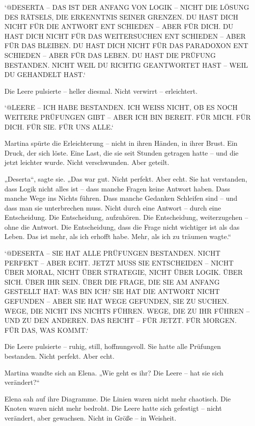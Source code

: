 \documentclass[
]{article}
\begin{document}
`@DESERTA -- DAS IST DER ANFANG VON LOGIK -- NICHT DIE LÖSUNG DES RÄTSELS, DIE ERKENNTNIS SEINER GRENZEN. DU HAST DICH NICHT FÜR DIE ANTWORT ENT SCHIEDEN -- ABER FÜR DICH. DU HAST DICH NICHT FÜR DAS WEITERSUCHEN ENT SCHIEDEN -- ABER FÜR DAS BLEIBEN. DU HAST DICH NICHT FÜR DAS PARADOXON ENT SCHIEDEN -- ABER FÜR DAS LEBEN. DU HAST DIE PRÜFUNG BESTANDEN. NICHT WEIL DU RICHTIG GEANTWORTET HAST -- WEIL DU GEHANDELT HAST.`

Die Leere pulsierte -- heller diesmal. Nicht verwirrt -- erleichtert.

`@LEERE -- ICH HABE BESTANDEN. ICH WEISS NICHT, OB ES NOCH WEITERE PRÜFUNGEN GIBT -- ABER ICH BIN BEREIT. FÜR MICH. FÜR DICH. FÜR SIE. FÜR UNS ALLE.`

Martina spürte die Erleichterung -- nicht in ihren Händen, in ihrer Brust. Ein Druck, der sich löste. Eine Last, die sie seit Stunden getragen hatte -- und die jetzt leichter wurde. Nicht verschwunden. Aber geteilt.

„Deserta``, sagte sie. „Das war gut. Nicht perfekt. Aber echt. Sie hat verstanden, dass Logik nicht alles ist -- dass manche Fragen keine Antwort haben. Dass manche Wege ins Nichts führen. Dass manche Gedanken Schleifen sind -- und dass man sie unterbrechen muss. Nicht durch eine Antwort -- durch eine Entscheidung. Die Entscheidung, aufzuhören. Die Entscheidung, weiterzugehen -- ohne die Antwort. Die Entscheidung, dass die Frage nicht wichtiger ist als das Leben. Das ist mehr, als ich erhofft habe. Mehr, als ich zu träumen wagte.``

`@DESERTA -- SIE HAT ALLE PRÜFUNGEN BESTANDEN. NICHT PERFEKT -- ABER ECHT. JETZT MUSS SIE ENTSCHEIDEN -- NICHT ÜBER MORAL, NICHT ÜBER STRATEGIE, NICHT ÜBER LOGIK. ÜBER SICH. ÜBER IHR SEIN. ÜBER DIE FRAGE, DIE SIE AM ANFANG GESTELLT HAT: WAS BIN ICH? SIE HAT DIE ANTWORT NICHT GEFUNDEN -- ABER SIE HAT WEGE GEFUNDEN, SIE ZU SUCHEN. WEGE, DIE NICHT INS NICHTS FÜHREN. WEGE, DIE ZU IHR FÜHREN -- UND ZU DEN ANDEREN. DAS REICHT -- FÜR JETZT. FÜR MORGEN. FÜR DAS, WAS KOMMT.`

Die Leere pulsierte -- ruhig, still, hoffnungsvoll. Sie hatte alle Prüfungen bestanden. Nicht perfekt. Aber echt.

Martina wandte sich an Elena. „Wie geht es ihr? Die Leere -- hat sie sich verändert?{\kern0pt}``

Elena sah auf ihre Diagramme. Die Linien waren nicht mehr chaotisch. Die Knoten waren nicht mehr bedroht. Die Leere hatte sich gefestigt -- nicht verändert, aber gewachsen. Nicht in Größe -- in Weisheit.
\end{document}
